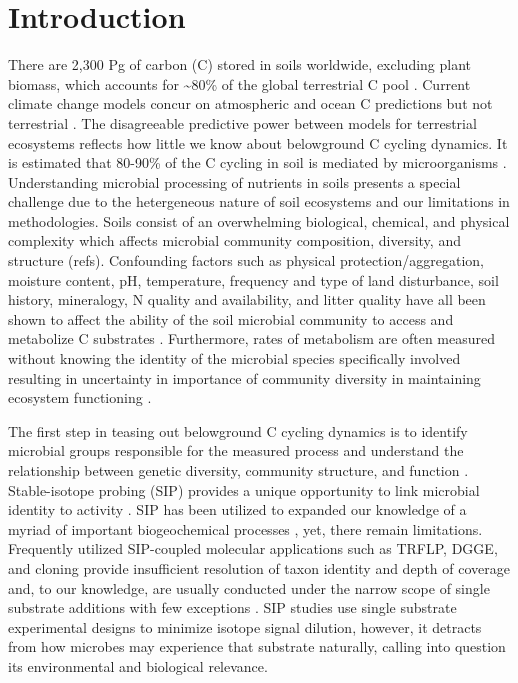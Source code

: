 \section{Introduction}
 
There are 2,300 Pg of carbon (C) stored in soils worldwide, excluding plant biomass, which accounts for \sim 80\% of the global terrestrial C pool \cite{Amundson_2001,Mendelsohn_2001,IPCC2007Synth,elsen_Ayres_Wall_Bardgett_2011,Lal_2008,BATJES_1996,Lal_2008}. Current climate change models concur on atmospheric and ocean C predictions but not terrestrial \cite{Friedlingstein_2006}.  The disagreeable predictive power between models for terrestrial ecosystems reflects how little we know about belowground C cycling dynamics. It is estimated that 80-90\% of the C cycling in soil is mediated by microorganisms \cite{ColemanCrossley_1996,Nannipieri_2003}. Understanding microbial processing of nutrients in soils presents a special challenge due to the hetergeneous nature of soil ecosystems and our limitations in methodologies. Soils consist of an overwhelming biological, chemical, and physical complexity which affects microbial community composition, diversity, and structure (refs).  Confounding factors such as physical protection/aggregation, moisture content, pH, temperature, frequency and type of land disturbance, soil history, mineralogy, N quality and availability, and litter quality have all been shown to affect the ability of the soil microbial community to access and metabolize C substrates \cite{Schlesinger_1977,dgett_Wall_Hattenschwiler_2010,Sollins_Homann_Caldwell_1996,Torn_Vitousek_Trumbore_2005,TRUMBORE_2006,Schimel_2012}. Furthermore, rates of metabolism are often measured without knowing the identity of the microbial species specifically involved \cite{ndi_Pietramellara_Renella_2003} resulting in uncertainty in importance of community diversity in maintaining ecosystem functioning \cite{Allison_2008,ndi_Pietramellara_Renella_2003,Schimel_2012}. 

The first step in teasing out belowground C cycling dynamics is to identify microbial groups responsible for the measured process and understand the relationship between genetic diversity, community structure, and function \cite{O_Donnell_2002}. Stable-isotope probing (SIP) provides a unique opportunity to link microbial identity to activity \cite{Chen_Murrell_2010}. SIP has been utilized to expanded our knowledge of a myriad of important biogeochemical processes \cite{Chen_Murrell_2010}, yet, there remain limitations. Frequently utilized SIP-coupled molecular applications such as TRFLP, DGGE, and cloning provide insufficient resolution of taxon identity and depth of coverage and, to our knowledge, are usually conducted under the narrow scope of single substrate additions with few exceptions \cite{Lueders_2003,Chauhan_2009}. SIP studies use single substrate experimental designs to minimize isotope signal dilution, however, it detracts from how microbes may experience that substrate naturally, calling into question its environmental and biological relevance.

